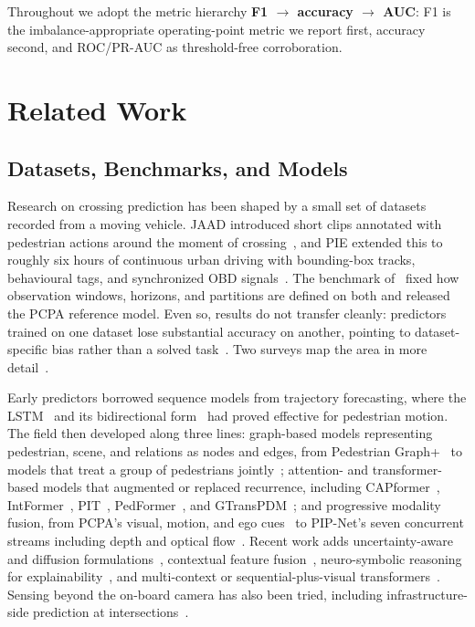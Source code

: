 \documentclass[mti,article,submit,moreauthors]{Definitions/mdpi}
\begin{document}
Throughout we adopt the metric hierarchy \textbf{F1 $\rightarrow$ accuracy $\rightarrow$ AUC}: F1 is the imbalance-appropriate operating-point metric we report first, accuracy second, and ROC/PR-AUC as threshold-free corroboration.

\section{Related Work}
\label{sec:relatedwork}

\subsection{Datasets, Benchmarks, and Models}

Research on crossing prediction has been shaped by a small set of datasets recorded from a moving vehicle. JAAD introduced short clips annotated with pedestrian actions around the moment of crossing~\citep{rasouli2017jaad}, and PIE extended this to roughly six hours of continuous urban driving with bounding-box tracks, behavioural tags, and synchronized OBD signals~\citep{rasouli2019pie}. The benchmark of~\citet{kotseruba2021benchmark} fixed how observation windows, horizons, and partitions are defined on both and released the PCPA reference model. Even so, results do not transfer cleanly: predictors trained on one dataset lose substantial accuracy on another, pointing to dataset-specific bias rather than a solved task~\citep{gesnouin2022assessing}. Two surveys map the area in more detail~\citep{sharma2022survey,rasouli2024diving}.

Early predictors borrowed sequence models from trajectory forecasting, where the LSTM~\citep{hochreiter1997lstm} and its bidirectional form~\citep{schuster1997bilstm} had proved effective for pedestrian motion. The field then developed along three lines: graph-based models representing pedestrian, scene, and relations as nodes and edges, from Pedestrian Graph+~\citep{cadena2022pedgraph} to models that treat a group of pedestrians jointly~\citep{zou2025group}; attention- and transformer-based models that augmented or replaced recurrence, including CAPformer~\citep{lorenzo2021capformer}, IntFormer~\citep{lorenzo2021intformer}, PIT~\citep{zhou2023pit}, PedFormer~\citep{rasouli2023pedformer}, and GTransPDM~\citep{xie2025gtranspdm}; and progressive modality fusion, from PCPA's visual, motion, and ego cues~\citep{kotseruba2021benchmark} to PIP-Net's seven concurrent streams including depth and optical flow~\citep{azarmi2025pipnet}. Recent work adds uncertainty-aware and diffusion formulations~\citep{chen2024pedcmt,liu2025occlusion}, contextual feature fusion~\citep{azarmi2023local}, neuro-symbolic reasoning for explainability~\citep{melocastillo2025neurosymbolic}, and multi-context or sequential-plus-visual transformers~\citep{li2025mft,landry2025trajfusionnet,liang2024tcl}. Sensing beyond the on-board camera has also been tried, including infrastructure-side prediction at intersections~\citep{abdelrahman2025vrucipi}.
\end{document}
